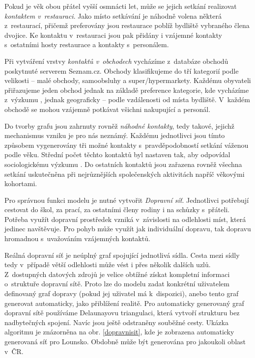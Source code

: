 Pokud je věk obou přátel vyšší osmnácti let, může se jejich setkání realizovat \emph{kontaktem v~restauraci}. Jako místo setkávání je náhodně volena některá z~restaurací, přičemž preferovány jsou restaurace poblíž bydliště vybraného člena dvojice. Ke kontaktu v~restauraci jsou pak přidány i vzájemné kontakty s~ostatními hosty restaurace a kontakty s~personálem.


Při vytváření vrstvy \emph{kontaktů v~obchodech} vycházíme z~databáze obchodů poskytnuté serverem Seznam.cz. Obchody klasifikujeme do tří kategorií podle velikosti -- malé obchody, samoobsluhy a super/hypermarkety. Každému obyvateli přiřazujeme jeden obchod jednak na základě preference kategorie, kde vycházíme z~výzkumu \cite{zaj:medianlife}, jednak geograficky -- podle vzdálenosti od místa bydliště. V~každém obchodě se mohou vzájemně potkávat všichni nakupující a personál.

Do tvorby grafu jsou zahrnuty rovněž \emph{náhodné kontakty}, tedy takové, jejichž mechanismus vzniku je pro nás neznámý. Každému jednotlivci jsou tímto způsobem vygenerovány tři možné kontakty s~pravděpodobností setkání váženou podle věku. Střední počet těchto kontaktů byl nastaven tak, aby odpovídal sociologickému výz\-ku\-mu \cite{Prem_etal2017}. Do ostatních kontaktů jsou zařazena rovněž všechna setkání uskutečněna při nejrůznějších společenských aktivitách napříč věkovými kohortami.

Pro správnou funkci modelu je nutné vytvořit \emph{Dopravní síť}. Jednotlivci potřebují cestovat do škol, za prací, za ostatními členy rodiny i na schůzky s~přáteli. Potřeba využít dopravní prostředek vzniká v~závislosti na odlehlosti míst, která jedinec navštěvuje. Pro pohyb může využít jak individuální dopravu, tak dopravu hromadnou s~uvažováním vzájemných kontaktů. 

Reálná dopravní síť je neúplný graf spojující jednotlivá sídla. Cesta mezi sídly tedy v~případě větší odlehlosti může vést i přes několik dalších uzlů. Z~dostupných datových zdrojů je velice obtížné získat kompletní informaci o~struktuře dopravní sítě. Proto lze do modelu zadat konkrétní uživatelem definovaný graf dopravy (pokud jej uživatel má k~dispozici), anebo tento graf generovat automaticky, jako přiblížení realitě. Pro automaticky generovaný graf dopravní sítě používáme Delaunayovu triangulaci, která vytvoří strukturu bez nadbytečných spojení. Navíc jsou ještě odstraněny souběžné cesty. Ukázka algoritmu je znázorněna na
obr. \ref{dopravnisit}, kde je zobrazena automaticky generovaná síť pro Lounsko. Obdobně může být generována pro jakoukoli oblast v~ČR. 

